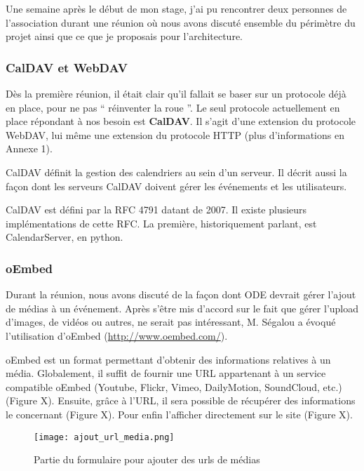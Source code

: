Une semaine après le début de mon stage, j'ai pu rencontrer deux personnes de l'association durant une réunion où nous avons discuté ensemble du périmètre du projet ainsi que ce que je proposais pour l'architecture.

\subsubsection*{CalDAV et WebDAV}

Dès la première réunion, il était clair qu'il fallait se baser sur un protocole déjà en place, pour ne pas `` réinventer la roue ''. Le seul protocole actuellement en place répondant à nos besoin est \textbf{CalDAV}. Il s'agit d'une extension du protocole WebDAV, lui même une extension du protocole HTTP (plus d'informations en Annexe 1). 

CalDAV définit la gestion des calendriers au sein d'un serveur. Il décrit aussi la façon dont les serveurs CalDAV doivent gérer les événements et les utilisateurs.

CalDAV est défini par la RFC 4791 datant de 2007. Il existe plusieurs implémentations de cette RFC. La première, historiquement parlant, est CalendarServer, en python.

\subsubsection*{oEmbed}

Durant la réunion, nous avons discuté de la façon dont ODE devrait gérer l'ajout de médias à un événement. Après s'être mis d'accord sur le fait que gérer l'upload d'images, de vidéos ou autres, ne serait pas intéressant, M. Ségalou a évoqué l'utilisation d'oEmbed (\url{http://www.oembed.com/}).

oEmbed est un format permettant d'obtenir des informations relatives à un média. Globalement, il suffit de fournir une URL appartenant à un service compatible oEmbed (Youtube, Flickr, Vimeo, DailyMotion, SoundCloud, etc.) (Figure X). Ensuite, grâce à l'URL, il sera possible de récupérer des informations le concernant (Figure X). Pour enfin l'afficher directement sur le site (Figure X).

\newpage

\begin{figure}[H]
\begin{center}
\texttt{[image: ajout\_url\_media.png]}
\end{center}
\caption{Partie du formulaire pour ajouter des urls de médias}
\end{figure}


